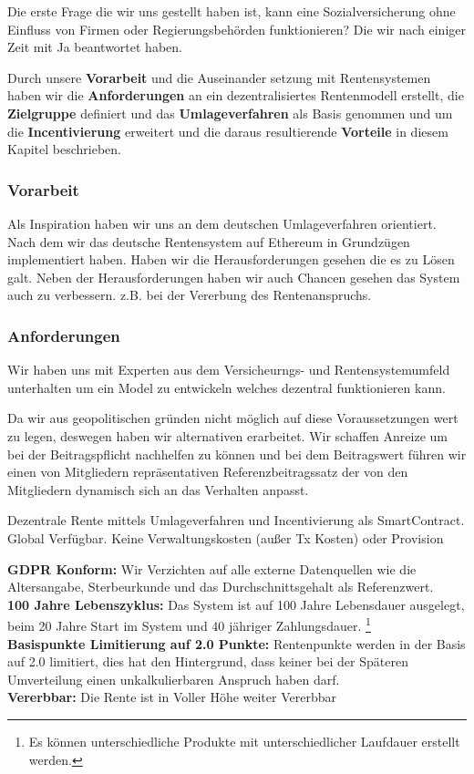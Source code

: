 Die erste Frage die wir uns gestellt haben ist, kann eine Sozialversicherung ohne Einfluss von Firmen oder Regierungsbehörden funktionieren? Die wir nach einiger Zeit mit Ja beantwortet haben.

Durch unsere \textbf{Vorarbeit} und die Auseinander setzung mit Rentensystemen haben wir die \textbf{Anforderungen} an ein dezentralisiertes Rentenmodell erstellt, die  \textbf{Zielgruppe} definiert und das \textbf{Umlageverfahren} als Basis genommen und um die \textbf{Incentivierung} erweitert und die daraus resultierende \textbf{Vorteile} in diesem Kapitel beschrieben.

\subsubsection*{Vorarbeit}

Als Inspiration haben wir uns an dem deutschen Umlageverfahren orientiert. Nach dem wir das deutsche Rentensystem auf Ethereum in Grundzügen implementiert haben. Haben wir die Herausforderungen gesehen die es zu Lösen galt.
Neben der Herausforderungen haben wir auch Chancen gesehen das System auch zu verbessern. z.B. bei der Vererbung des Rentenanspruchs.


\subsubsection*{Anforderungen}
Wir haben uns mit Experten aus dem Versicheurngs- und Rentensystemumfeld unterhalten um ein Model zu entwickeln welches dezentral funktionieren kann.

Da wir aus geopolitischen gründen nicht möglich auf diese Voraussetzungen wert zu legen, deswegen haben wir alternativen erarbeitet.
Wir schaffen Anreize um bei der Beitragspflicht nachhelfen zu können und bei dem Beitragswert führen wir einen von Mitgliedern repräsentativen Referenzbeitragssatz der von den Mitgliedern dynamisch sich an das Verhalten anpasst.

Dezentrale Rente mittels Umlageverfahren und Incentivierung als SmartContract.
Global Verfügbar. Keine Verwaltungskosten (außer Tx Kosten) oder Provision

\textbf{GDPR\cite{gdpr} Konform:} Wir Verzichten auf alle externe Datenquellen wie die Altersangabe, Sterbeurkunde und das Durchschnittsgehalt als Referenzwert.\\
\textbf{100 Jahre Lebenszyklus:} Das System ist auf 100 Jahre Lebensdauer ausgelegt, beim 20 Jahre Start im System und 40 jähriger Zahlungsdauer. \footnote{ Es können unterschiedliche Produkte mit unterschiedlicher Laufdauer erstellt werden.} \\
\textbf{Basispunkte Limitierung auf 2.0 Punkte:} Rentenpunkte werden in der Basis auf 2.0 limitiert, dies hat den Hintergrund, dass keiner bei der Späteren Umverteilung einen unkalkulierbaren Anspruch haben darf.\\
\textbf{Vererbbar:} Die Rente ist in Voller Höhe weiter Vererbbar


